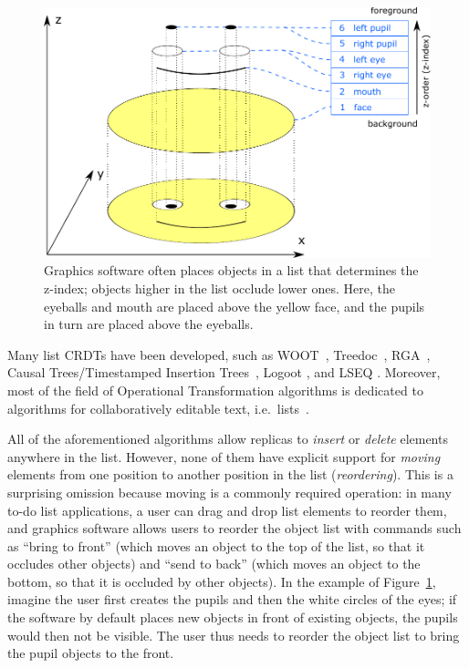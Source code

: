 \documentclass[sigplan,10pt]{acmart}
\begin{document}
\begin{figure}
  \centering
  \includegraphics{smiley.pdf}
  \caption{Graphics software often places objects in a list that determines the z-index; objects higher in the list occlude lower ones. %
    Here, the eyeballs and mouth are placed above the yellow face, and the pupils in turn are placed above the eyeballs.}
  \label{fig:smiley}
\end{figure}

Many list CRDTs have been developed, such as WOOT~\cite{Oster:2006wj}, Treedoc~\cite{Preguica:2009fz}, RGA~\cite{Roh:2011dw}, Causal Trees/Timestamped Insertion Trees~\cite{Grishchenko:2014eh,Attiya:2016kh}, Logoot \cite{Weiss:2009ht,Weiss:2010hx}, and LSEQ \cite{Nedelec:2013ky,Nedelec:2016eo}.
Moreover, most of the field of Operational Transformation algorithms is dedicated to algorithms for collaboratively editable text, i.e.\ lists~\cite{Ellis:1989ue,Nichols:1995fd,Ressel:1996wx,Sun:1998vf,Oster:2006tr}.

All of the aforementioned algorithms allow replicas to \emph{insert} or \emph{delete} elements anywhere in the list.
However, none of them have explicit support for \emph{moving} elements from one position to another position in the list (\emph{reordering}).
This is a surprising omission because moving is a commonly required operation: in many to-do list applications, a user can drag and drop list elements to reorder them, and graphics software allows users to reorder the object list with commands such as ``bring to front'' (which moves an object to the top of the list, so that it occludes other objects) and ``send to back'' (which moves an object to the bottom, so that it is occluded by other objects).
In the example of Figure~\ref{fig:smiley}, imagine the user first creates the pupils and then the white circles of the eyes; if the software by default places new objects in front of existing objects, the pupils would then not be visible.
The user thus needs to reorder the object list to bring the pupil objects to the front.
\end{document}
